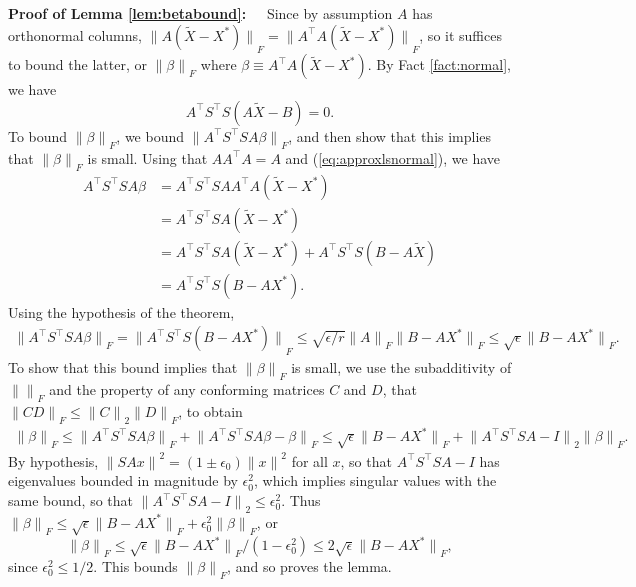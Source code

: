 \documentclass{sig-alternate}
\newcommand{\normF}[1]{{\| #1 \|}_F}
\newcommand{\norm}[1]{{\| #1 \|}}
\newcommand{\ZZ}{S}
\def\FullBox{\hbox{\vrule width 8pt height 8pt depth 0pt}}
\def\qed{\ifmmode\qquad\FullBox\else{\unskip\nobreak\hfil
\penalty50\hskip1em\null\nobreak\hfil\FullBox
\parfillskip=0pt\finalhyphendemerits=0\endgraf}\fi}
\newenvironment{proofof}[1]{\begin{trivlist} \item {\bf Proof
#1:~~}}
  {\qed\end{trivlist}}
\begin{document}
\begin{proofof}{of Lemma \ref{lem:betabound}}
Since by assumption $A$ has orthonormal columns,
$\normF{A(\tilde X - X^*)} = \normF{A^\top A(\tilde X - X^*)}$,
so it suffices to bound the latter, or $\normF{\beta}$ where
$\beta\equiv A^\top A(\tilde X - X^*)$.
By Fact \ref{fact:normal}, we have 
\begin{equation}\label{eq:approxlsnormal}
A^\top  \ZZ ^\top  \ZZ  (A \tilde{X} - B) = 0.
\end{equation}
To bound $\normF{\beta}$, we bound
$\normF{A^\top  \ZZ ^\top  \ZZ  A \beta}$, and then show that
this implies that $\normF{\beta}$ is small.
Using that $A A^\top  A = A$ and (\ref{eq:approxlsnormal}), we have
\begin{align*}
A^\top  \ZZ ^\top  \ZZ  A \beta
        & = A^\top  \ZZ ^\top  \ZZ  A A^\top  A (\tilde{X} - X^*)
        \\ & = A^\top  \ZZ ^\top  \ZZ  A (\tilde{X} - X^*)
        \\ & = A^\top  \ZZ ^\top  \ZZ  A(\tilde{X} - X^*) + A^\top  \ZZ ^\top  \ZZ  (B-A\tilde{X})
        \\ & = A^\top  \ZZ ^\top  \ZZ  (B - AX^*).
\end{align*}
Using the hypothesis of the theorem, 
\begin{align*}
\normF{A^\top  \ZZ ^\top  \ZZ  A \beta}
        = \normF{A^\top  \ZZ ^\top  \ZZ  (B - A X^*)}
        \le \sqrt{\epsilon/r}\normF{A}\normF{B-A X^*}
        \le \sqrt{\epsilon}\normF{B - A X^*}.
\end{align*}
To show that this bound implies that $\normF{\beta}$
is small, we use the subadditivity of $\normF{}$ and
the property of any conforming matrices $C$ and $D$,
that $\normF{CD}\le \norm{C}_2\normF{D}$,
to obtain
\begin{align*}
\normF{\beta}
       \le \normF{A^\top  \ZZ ^\top  \ZZ  A \beta} +  \normF{A^\top  \ZZ ^\top  \ZZ  A \beta- \beta}
       \le \sqrt{\epsilon}\normF{B - A X^*} + \norm{A^\top  \ZZ ^\top  \ZZ  A - I }_2 \normF{\beta}.
\end{align*}
By hypothesis,
$\norm{\ZZ A x}^2 = (1\pm\epsilon_0)\norm{x}^2$ for all $x$,
so that $A^\top  \ZZ ^\top  \ZZ  A - I$ has eigenvalues bounded in magnitude by $\epsilon_0^2$,
which implies singular values with the same bound, so that 
$\norm{A^\top  \ZZ ^\top  \ZZ  A - I }_2\le \epsilon^2_0$.
Thus
$\normF{\beta}\le \sqrt{\epsilon}\normF{B - AX^*} + \epsilon^2_0\normF{\beta}$,
or
\begin{equation*}
\normF{\beta} \le \sqrt{\epsilon}\normF{B - A X^*} / (1-\epsilon^2_0) \le 2\sqrt{\epsilon}\normF{B - A X^*},
\end{equation*}
since $\epsilon^2_0\le 1/2$. This bounds $\normF{\beta}$,
and so proves the lemma.
\end{proofof}
\end{document}
